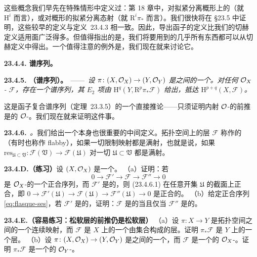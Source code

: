 这些概念我们早先在特殊情形中定义过：第 18 章中，对拟紧分离概形上的\trQCSheaf{}（就 $\mathrm{H}^i$ 而言），或对概形的拟紧分离态射（就 $\mathrm{R}^i\pi_\ast$ 而言）。我们很快将在 \S23.5 中证明，这些较早的定义与\mbox{定义~23.4.3} 相一致。因此，导出函子的定义比我们的切赫定义适用面广泛得多。但值得指出的是，我们将要用到的几乎所有东西都可以从切赫定义中得出。一个值得注意的例外是\trLeray{}\trSpectralSequence，我们现在就来讨论它。

\textbf{23.4.4. \trLeray{}谱序列。}\quad

\textbf{23.4.5. \trhTheorem（\trLeray{}谱序列）。}\ ——\ \emph{设 $\pi\colon(X,\mathcal{O}_X)\to(Y,\mathcal{O}_Y)$ 是\trRingedSpace{}之间的一个\trMorphism。对任何 $\mathcal{O}_X$-\trModule{} $\mathscr{F}$，存在一个谱序列，其 $E_2$ 项由 $\mathrm{H}^q(Y,\mathrm{R}^p\pi_\ast\mathscr{F})$ 给出，抵达 $\mathrm{H}^{p+q}(X,\mathscr{F})$。}

这是\trGrothendieck 函子复合谱序列（\mbox{定理~23.3.5}）的一个直接推论——只须证明内射 $\mathcal{O}$-\trModule{}的前推是\trAcyclic{}的 $\mathcal{O}$-\trModule。我们现在就来证明这件事。

\textbf{23.4.6.}\ \emph{\trhDefinition。}\quad 我们给出一个本身也很重要的中间定义。拓扑空间上的层 $\mathscr{F}$ 称作\textbf{\trFlasque}的（有时也称作 flabby），如果一切限制映射都是满射，也就是说，如果 $\mathrm{res}_{\mathfrak{U}\subset\mathfrak{V}}\colon\mathscr{F}(\mathfrak{V})\to\mathscr{F}(\mathfrak{U})$ 对一切 $\mathfrak{U}\subset\mathfrak{V}$ 都是满射。

\textbf{23.4.D.（练习）}\quad 设 $(X,\mathcal{O}_X)$ 是一个\trRingedSpace。
（a）证明：若
\[
\tag{23.4.6.1}\label{eq:flasque-ses}
0 \longrightarrow \mathscr{F}' \longrightarrow \mathscr{F} \longrightarrow \mathscr{F}'' \longrightarrow 0
\]
是 $\mathcal{O}_X$-\trModule{}的一个正合序列，而 $\mathscr{F}'$ 是\trFlasque{}的，则 (23.4.6.1) 在任意开集 $\mathfrak{U}$ 的截面上正合，即 $0\to\mathscr{F}'(\mathfrak{U})\to\mathscr{F}(\mathfrak{U})\to\mathscr{F}''(\mathfrak{U})\to 0$
是正合的。
（b）给定正合序列 \eqref{eq:flasque-ses}，若 $\mathscr{F}'$ 是\trFlasque{}的，证明：$\mathscr{F}$ 是\trFlasque{}的当且仅当 $\mathscr{F}''$ 是\trFlasque{}的。

\textbf{23.4.E.（容易练习：松软层的前推仍是松软层）}\quad
（a）设 $\pi\colon X\to Y$ 是拓扑空间之间的一个连续映射，而 $\mathscr{F}$ 是 $X$ 上的一个由集合构成的\trFlasque{}层。证明 $\pi_\ast\mathscr{F}$ 是 $Y$ 上的一个\trFlasque{}层。
（b）设 $\pi\colon(X,\mathcal{O}_X)\to(Y,\mathcal{O}_Y)$ 是\trRingedSpace{}之间的一个\trMorphism，而 $\mathscr{F}$ 是一个\trFlasque{}的 $\mathcal{O}_X$-\trModule。证明 $\pi_\ast\mathscr{F}$ 是一个\trFlasque{}的 $\mathcal{O}_Y$-\trModule。

